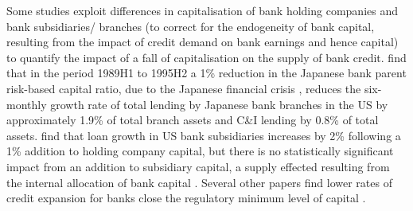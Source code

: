 \documentclass[
]{article}
\begin{document}
Some studies exploit differences in capitalisation of bank holding companies and bank subsidiaries/ branches (to correct for the endogeneity of bank capital, resulting from the impact of credit demand on bank earnings and hence capital) to quantify the impact of a fall of capitalisation on the supply of bank credit. \citet{peek1997international} find that in the period 1989H1 to 1995H2 a 1\% reduction in the Japanese bank parent risk-based capital ratio, due to the Japanese financial crisis , reduces the six-monthly growth rate of total lending by Japanese bank branches in the US by approximately 1.9\% of total branch assets and C\&I lending by 0.8\% of total assets. \citet{houston1997capital} find that loan growth in US bank subsidiaries increases by 2\% following a 1\% addition to holding company capital, but there is no statistically significant impact from an addition to subsidiary capital, a supply effected resulting from the internal allocation of bank capital \citep[see,][ on losses in the 1930s]{calomiris2003fundamentals, calomiris1998bank}. Several other papers find lower rates of credit expansion for banks close the regulatory minimum level of capital \citep[see,][]{hancock1994bank, berger1994lines, nier2005bank, van2008welfare, gambacorta2004does, berrospide2010effects}.
\end{document}
